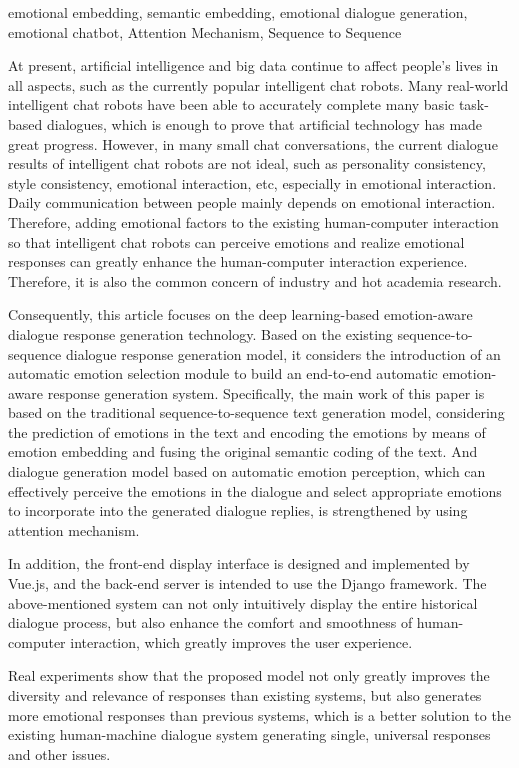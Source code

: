 \documentclass[supercite]{HustGraduPaper}
\theoremstyle{definition}
\begin{document}
\begin{enabstract}{emotional embedding, semantic embedding, emotional dialogue generation, emotional chatbot, Attention Mechanism, Sequence to Sequence}

At present, artificial intelligence and big data continue to affect people's lives in all aspects, such as the currently popular intelligent chat robots. 
Many real-world intelligent chat robots have been able to accurately complete many basic task-based dialogues, 
which is enough to prove that artificial technology has made great progress. 
However, in many small chat conversations, the current dialogue results of intelligent chat robots are not ideal, 
such as personality consistency, style consistency, emotional interaction, etc, especially in emotional interaction. 
Daily communication between people mainly depends on emotional interaction. Therefore, adding emotional factors to the existing 
human-computer interaction so that intelligent chat robots can perceive emotions and realize emotional responses can greatly enhance 
the human-computer interaction experience. Therefore, it is also the common concern of industry and hot academia research.

Consequently, this article focuses on the deep learning-based emotion-aware dialogue response generation technology. Based on the existing 
sequence-to-sequence dialogue response generation model, it considers the introduction of an automatic emotion selection module to build 
an end-to-end automatic emotion-aware response generation system. Specifically, the main work of this paper is based on the traditional 
sequence-to-sequence text generation model, considering the prediction of emotions in the text and encoding the emotions
by means of emotion embedding and fusing the original semantic coding of the text. And dialogue generation model based on automatic emotion 
perception, which can effectively perceive the emotions in the dialogue and select appropriate emotions to incorporate into the generated 
dialogue replies, is strengthened by using attention mechanism. 

In addition, the front-end display interface is designed and implemented by Vue.js, and the back-end server is intended to use the Django framework. The above-mentioned system 
can not only intuitively display the entire historical dialogue process, but also enhance the comfort and smoothness of human-computer 
interaction, which greatly improves the user experience.

Real experiments show that the proposed model not only greatly improves the diversity and relevance of responses than existing systems, 
but also generates more emotional responses than previous systems, which is a better solution to the existing human-machine dialogue system 
generating single, universal responses and other issues.

\end{enabstract}
\end{document}
